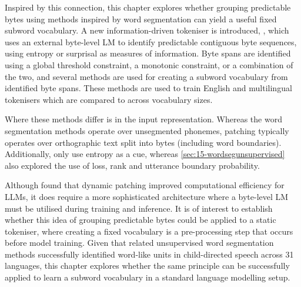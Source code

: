 Inspired by this connection, this chapter explores whether grouping predictable bytes using methods inspired by word segmentation can yield a useful fixed subword vocabulary. A new information-driven tokeniser is introduced, \bytespan, which uses an external byte-level LM to identify predictable contiguous byte sequences, using entropy or surprisal as measures of information. Byte spans are identified using a global threshold constraint, a monotonic constraint, or a combination of the two, and several methods are used for creating a subword vocabulary from identified byte spans. These methods are used to train English and multilingual tokenisers which are compared to \bpe across vocabulary sizes. 




Where these methods differ is in the input representation. Whereas the word segmentation methods operate over unsegmented phonemes, patching typically operates over orthographic text split into bytes (including word boundaries). Additionally, \citet{pagnoni2024byte} only use entropy as a cue, whereas \cref{sec:15-wordsegunsupervised} also explored the use of loss, rank and utterance boundary probability.

Although \citet{pagnoni2024byte} found that dynamic patching improved computational efficiency for LLMs, it does require a more sophisticated architecture where a byte-level LM must be utilised during training and inference. It is of interest to establish whether this idea of grouping predictable bytes could be applied to a static tokeniser, where creating a fixed vocabulary is a pre-processing step that occurs before model training. Given that related unsupervised word segmentation methods successfully identified word-like units in child-directed speech across 31 languages, this chapter explores whether the same principle can be successfully applied to learn a subword vocabulary in a standard language modelling setup. 

